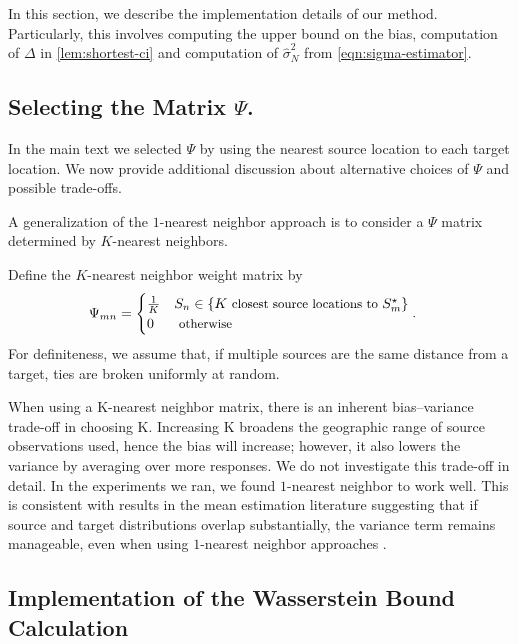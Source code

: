 In this section, we describe the implementation details of our method. Particularly, this involves computing the upper bound on the bias, computation of $\Delta$ in \cref{lem:shortest-ci} and computation of $\hat{\sigma}^2_N$ from \cref{eqn:sigma-estimator}.

\subsection{Selecting the Matrix $\Psi$.}\label{app:psi-choices}
In the main text we selected $\Psi$ by using the nearest source location to each target location. We now provide additional discussion about alternative choices of $\Psi$ and possible trade-offs. 

A generalization of the $1$-nearest neighbor approach is to consider a $\Psi$ matrix determined by $K$-nearest neighbors.
\begin{definition}\label{def:knn-psi}
    Define the $K$-nearest neighbor weight matrix by
    \begin{align}
        \Psi_{mn} & = \begin{cases}
            \frac{1}{K} & S_n \in \{ K \text{ \small closest source locations to } S^{\star}_m \}\\
            0 & \text{ \small otherwise}
        \end{cases}
        .
    \end{align}
    For definiteness, we assume that, if multiple sources are the same distance from a target, ties are broken uniformly at random. 
\end{definition}

When using a K-nearest neighbor matrix, there is an inherent bias–variance trade-off in choosing K. Increasing K broadens the geographic range of source observations used, hence the bias will increase; however, it also lowers the variance by averaging over more responses.  We do not investigate this trade-off in detail. In the experiments we ran, we found $1$-nearest neighbor to work well. This is consistent with results in the mean estimation literature suggesting that if source and target distributions overlap substantially, the variance term remains manageable, even when using $1$-nearest neighbor approaches \citep{portier2023scalable}.

\subsection{Implementation of the Wasserstein Bound Calculation}\label{app:implementation-wasserstein}

